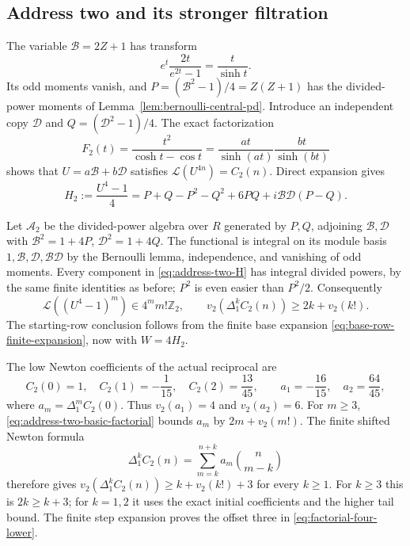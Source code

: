 \subsection{Address two and its stronger filtration}

The variable $\mathcal B=2Z+1$ has transform
\[
 e^t\frac{2t}{e^{2t}-1}=\frac{t}{\sinh t}.
\]
Its odd moments vanish, and
$P=(\mathcal B^2-1)/4=Z(Z+1)$ has the divided-power moments of
Lemma~\ref{lem:bernoulli-central-pd}. Introduce an independent copy
$\mathcal D$ and $Q=(\mathcal D^2-1)/4$. The exact factorization
\begin{equation}
 F_2(t)=\frac{t^2}{\cosh t-\cos t}
       =\frac{at}{\sinh(at)}\frac{bt}{\sinh(bt)}
 \label{eq:address-two-factorization}
\end{equation}
shows that $U=a\mathcal B+b\mathcal D$ satisfies
$\mathcal L(U^{4n})=C_2(n)$. Direct expansion gives
\begin{equation}
 H_2:=\frac{U^4-1}{4}
     =P+Q-P^2-Q^2+6PQ+i\mathcal B\mathcal D(P-Q).
 \label{eq:address-two-H}
\end{equation}

Let $\mathcal A_2$ be the divided-power algebra over $R$ generated by
$P,Q$, adjoining $\mathcal B,\mathcal D$ with
$\mathcal B^2=1+4P$, $\mathcal D^2=1+4Q$.
The functional is integral on its module basis
$1,\mathcal B,\mathcal D,\mathcal B\mathcal D$ by the Bernoulli lemma,
independence, and vanishing of odd moments. Every component in
\eqref{eq:address-two-H} has integral divided powers, by the same
finite identities as before; $P^2$ is even easier than $P^2/2$.
Consequently
\begin{equation}
 \mathcal L((U^4-1)^m)\in4^m m!\mathbb Z_2,
 \qquad
 v_2(\Delta_1^kC_2(n))\geq2k+v_2(k!).
 \label{eq:address-two-basic-factorial}
\end{equation}
The starting-row conclusion follows from the finite base expansion
\eqref{eq:base-row-finite-expansion}, now with $W=4H_2$.

The low Newton coefficients of the actual reciprocal are
\begin{equation}
 C_2(0)=1,\quad C_2(1)=-\frac1{15},\quad C_2(2)=\frac{13}{45},
 \qquad a_1=-\frac{16}{15},\quad a_2=\frac{64}{45},
 \label{eq:address-two-initial-newton}
\end{equation}
where $a_m=\Delta_1^m C_2(0)$. Thus $v_2(a_1)=4$ and $v_2(a_2)=6$.
For $m\geq3$, \eqref{eq:address-two-basic-factorial} bounds $a_m$ by
$2m+v_2(m!)$. The finite shifted Newton formula
\begin{equation}
 \Delta_1^kC_2(n)=\sum_{m=k}^{n+k}a_m\binom n{m-k}
 \label{eq:shifted-newton-finite}
\end{equation}
therefore gives
$v_2(\Delta_1^kC_2(n))\geq k+v_2(k!)+3$ for every $k\geq1$.
For $k\geq3$ this is $2k\geq k+3$; for $k=1,2$ it uses the exact
initial coefficients and the higher tail bound. The finite step
expansion proves the offset three in
\eqref{eq:factorial-four-lower}.

